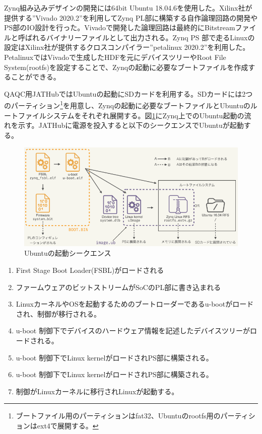 Zynq組み込みデザインの開発には64bit Ubuntu 18.04.6を使用した。Xilinx社が提供する”Vivado 2020.2”を利用してZynq PL部に構築する自作論理回路の開発やPS部のIO設計を行った。Vivadoで開発した論理回路は最終的にBitstreamファイルと呼ばれるバイナリーファイルとして出力される。Zynq PS 部で走るLinuxの設定はXilinx社が提供するクロスコンパイラー”petalinux 2020.2”を利用した。PetalinuxではVivadoで生成したHDFを元にデバイスツリーやRoot File System(rootfs)を設定することで、Zynqの起動に必要なブートファイルを作成することができる。\par
QAQC用JATHubではUbuntuの起動にSDカードを利用する。SDカードには2つのパーティション\footnote{ブートファイル用のパーティションはfat32、Ubuntuのrootfs用のパーティションはext4で展開する。}を用意し、Zynqの起動に必要なブートファイルとUbuntuのルートファイルシステムをそれぞれ展開する。図\ref{JATHubboot}にZynq上でのUbuntu起動の流れを示す\cite{mt_okazaki}。JATHubに電源を投入すると以下のシークエンスでUbuntuが起動する。

\begin{figure} 
\centering
\includegraphics[width=16cm]{fig/QAQC/JATHubboot.png}
\caption[Ubuntuの起動シークエンス]{Ubuntuの起動シークエンス}
\label{JATHubboot}
\end{figure}

\begin{enumerate}
    \item First Stage Boot Loader(FSBL)がロードされる
    \item ファームウェアのビットストリームがSoCのPL部に書き込まれる
    \item LinuxカーネルやOSを起動するためのブートローダーであるu-bootがロードされ、制御が移行される。
    \item u-boot 制御下でデバイスのハードウェア情報を記述したデバイスツリーがロードされる。
    \item u-boot 制御下でLinux kernelがロードされPS部に構築される。
    \item u-boot 制御下でLinux kernelがロードされPS部に構築される。
    \item 制御がLinuxカーネルに移行されLinuxが起動する。
\end{enumerate}

